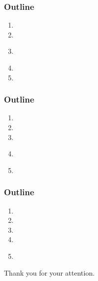 \documentclass[usenames,dvipsnames]{beamer}
\begin{document}


\miniframesoff
  \begin{frame}
    \frametitle{\textbf{Outline}}
  \begin{enumerate}
    \item \introtitle
    \item \firsttitle
    \item \textbf{\secondtitle}
    \item \thirdtitle
    \item \conclusiontitle
  \end{enumerate}
  \end{frame}
\miniframeson



\miniframesoff
  \begin{frame}
    \frametitle{\textbf{Outline}}
  \begin{enumerate}
    \item \introtitle
    \item \firsttitle
    \item \secondtitle
    \item \textbf{\thirdtitle}
    \item \conclusiontitle
  \end{enumerate}
  \end{frame}
\miniframeson


  
\miniframesoff
  \begin{frame}
    \frametitle{\textbf{Outline}}
  \begin{enumerate}
    \item \introtitle
    \item \firsttitle
    \item \secondtitle
    \item \thirdtitle
    \item \textbf{\conclusiontitle}
  \end{enumerate}
  \end{frame}
\miniframeson



\begin{frame}{}
  \centering
  \vspace{2em}
  Thank you for your attention.
\end{frame}
\end{document}
